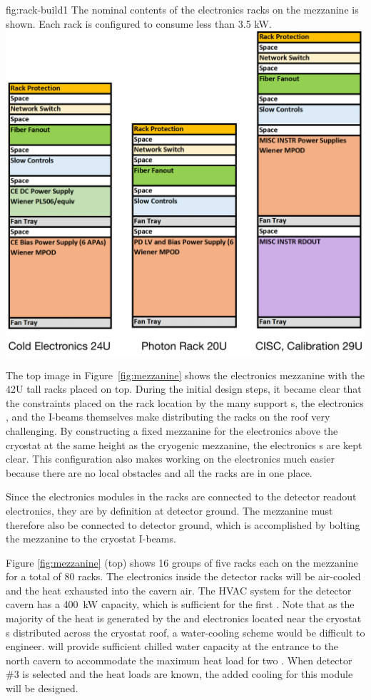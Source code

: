 \begin{dunefigure}{fig:rack-build1}
  {The nominal contents of the electronics racks on the mezzanine is shown. Each rack is configured to consume less than 3.5 \si{kW}.  }
 \includegraphics[width=.8\textwidth]{graphics/rack-build} 
\end{dunefigure}

The top image in Figure~\ref{fig:mezzanine} shows the  electronics mezzanine with the 42U tall racks placed on top. 
During the initial design steps, it became clear that the constraints placed on the rack location by the many  support \fdth{}s, the electronics \fdth, and the I-beams themselves make distributing the racks on the roof very challenging. 
By constructing a fixed mezzanine for the electronics above the cryostat at the same height as the cryogenic mezzanine, the electronics \fdth{}s are kept clear. 
This configuration also makes working on the electronics much easier because there are no local obstacles and all the racks are in one place.

Since the electronics modules in the  racks are connected to the detector readout electronics, they are by definition at detector ground. The mezzanine must therefore also be connected to detector ground, which is accomplished by bolting the mezzanine to the cryostat I-beams. 


 
Figure \ref{fig:mezzanine} (top) shows 16 groups of five racks each
on the mezzanine for a total of 80 racks. 
The electronics inside the detector racks will be air-cooled and the heat exhausted into the cavern air. The HVAC system for the detector cavern has a \SI{400}{kW} capacity, which is sufficient for the first .  Note that as the majority of the heat is generated by the  and  electronics located near the cryostat \fdth{}s distributed across the cryostat roof, a water-cooling scheme would be difficult to engineer.
  will provide sufficient chilled water capacity at the entrance to the north cavern to accommodate the maximum heat load for two . When detector \#3 is selected and the heat loads are known, the added cooling for this module will be designed.



